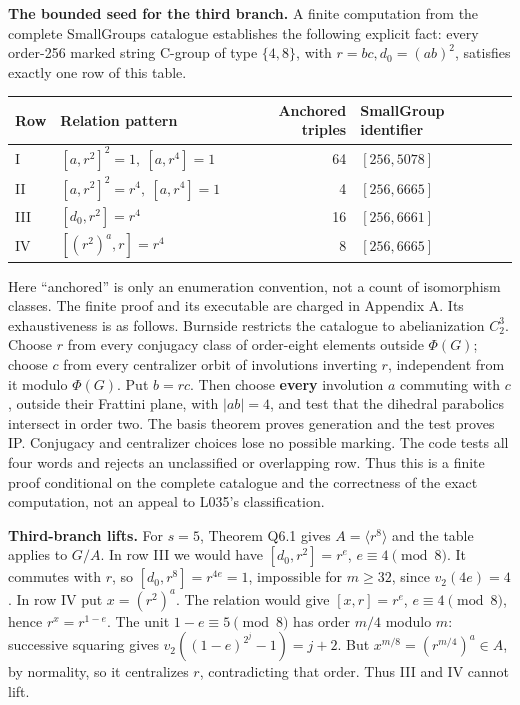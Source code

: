 \documentclass[
  10pt,
  letterpaper,
]{article}
\newcounter{none} %
\begin{document}
\textbf{The bounded seed for the third branch.} A finite computation
from the complete SmallGroups catalogue establishes the following
explicit fact: every order-256 marked string C-group of type
\(\{4,8\}\), with \(r=bc,d_0=(ab)^2\), satisfies exactly one row of this
table.

{\def\LTcaptype{none} %
\begin{longtable}[]{@{}llrl@{}}
\toprule\noalign{}
Row & Relation pattern & Anchored triples & SmallGroup identifier \\
\midrule\noalign{}
\endhead
\bottomrule\noalign{}
\endlastfoot
I & \([a,r^2]^2=1,\ [a,r^4]=1\) & 64 & \([256,5078]\) \\
II & \([a,r^2]^2=r^4,\ [a,r^4]=1\) & 4 & \([256,6665]\) \\
III & \([d_0,r^2]=r^4\) & 16 & \([256,6661]\) \\
IV & \([(r^2)^a,r]=r^4\) & 8 & \([256,6665]\) \\
\end{longtable}
}

Here ``anchored'' is only an enumeration convention, not a count of
isomorphism classes. The finite proof and its executable are charged in
Appendix A. Its exhaustiveness is as follows. Burnside restricts the
catalogue to abelianization \(C_2^3\). Choose \(r\) from every conjugacy
class of order-eight elements outside \(\Phi(G)\); choose \(c\) from
every centralizer orbit of involutions inverting \(r\), independent from
it modulo \(\Phi(G)\). Put \(b=rc\). Then choose \textbf{every}
involution \(a\) commuting with \(c\), outside their Frattini plane,
with \(|ab|=4\), and test that the dihedral parabolics intersect in
order two. The basis theorem proves generation and the test proves IP.
Conjugacy and centralizer choices lose no possible marking. The code
tests all four words and rejects an unclassified or overlapping row.
Thus this is a finite proof conditional on the complete catalogue and
the correctness of the exact computation, not an appeal to L035's
classification.

\textbf{Third-branch lifts.} For \(s=5\), Theorem Q6.1 gives
\(A=\langle r^8\rangle\) and the table applies to \(G/A\). In row III we
would have \([d_0,r^2]=r^e\), \(e\equiv4\pmod8\). It commutes with
\(r\), so \([d_0,r^8]=r^{4e}=1\), impossible for \(m\ge32\), since
\(v_2(4e)=4\). In row IV put \(x=(r^2)^a\). The relation would give
\([x,r]=r^e\), \(e\equiv4\pmod8\), hence \(r^x=r^{1-e}\). The unit
\(1-e\equiv5\pmod8\) has order \(m/4\) modulo \(m\): successive squaring
gives \(v_2((1-e)^{2^j}-1)=j+2\). But \(x^{m/8}=(r^{m/4})^a\in A\), by
normality, so it centralizes \(r\), contradicting that order. Thus III
and IV cannot lift.
\end{document}
